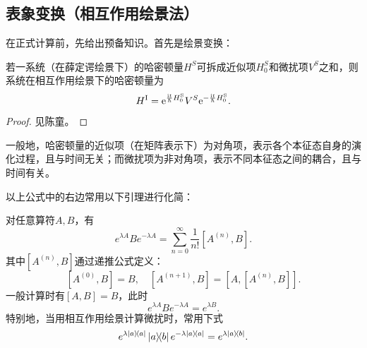 \documentclass[
fontsetup = font-setup-open.tex,
titlesetup = titles-setup.tex
]{AJbook}
\numberwithin{equation}{section}
\begin{document}
\subsection{表象变换（相互作用绘景法）}
在正式计算前，先给出预备知识。首先是绘景变换：
\begin{theorem}\label{hstohi}
若一系统（在薛定谔绘景下）的哈密顿量$ H^S $可拆成近似项$ H_0^S $和微扰项$ V^S $之和，则系统在相互作用绘景下的哈密顿量为
\begin{equation}
H^\mathrm{I}=\mathrm{e}^{\frac{\mathrm{i}t}{\hbar} H_0^\mathrm{S}}V^S\mathrm{e}^{-\frac{\mathrm{i}t}{\hbar} H_0^\mathrm{S}}.
\end{equation}
\end{theorem}
\begin{proof}
见陈童\cite{ctqm}。
\end{proof}
\begin{remark}
一般地，哈密顿量的近似项（在矩阵表示下）为对角项，表示各个本征态自身的演化过程，且与时间无关；而微扰项为非对角项，表示不同本征态之间的耦合，且与时间有关。
\end{remark}
以上公式中的右边常用以下引理进行化简：
\begin{lemma}[曾谨言习题4.37]\label{zjy437}
对任意算符$ A,B $，有
\begin{equation}\label{key}
e^{\lambda A}Be^{-\lambda A}=\sum_{n=0}^{\infty}\frac{1}{n!}[A^{(n)},B].
\end{equation}
其中$ [A^{(n)},B] $通过递推公式定义：
\begin{equation}\label{key}
[A^{(0)},B]=B,\quad [A^{(n+1)},B]=[A,[A^{(n)},B]].
\end{equation}
一般计算时有$ [A,B]=B $，此时
\begin{equation}\label{key}
e^{\lambda A}Be^{-\lambda A}=e^{\lambda B}.
\end{equation}
特别地，当用相互作用绘景计算微扰时，常用下式
\begin{equation}\label{key}
e^{\lambda\ketbra{a}{a}}\ketbra{a}{b}e^{-\lambda\ketbra{a}{a}}=e^{\lambda\ketbra{a}{b}}.
\end{equation}
\end{lemma}
\end{document}
